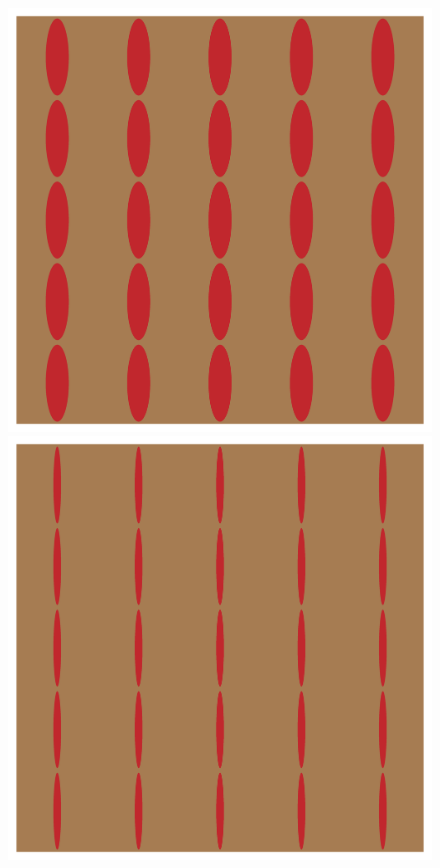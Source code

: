 \documentclass[a4paper,num-refs]{oup-contemporary}
\begin{document}
\begin{figure}
\begin{minipage}[b]{0.19\linewidth}
	\end{minipage}
	\begin{minipage}[b]{0.19\linewidth}
		\includegraphics[width=\linewidth]{test_mesh_axR_0.3.png}
	\end{minipage} 
	\begin{minipage}[b]{0.19\linewidth}
		\includegraphics[width=\linewidth]{test_mesh_axR_0.1.png}
	\end{minipage} 
	

\end{figure}
\end{document}
